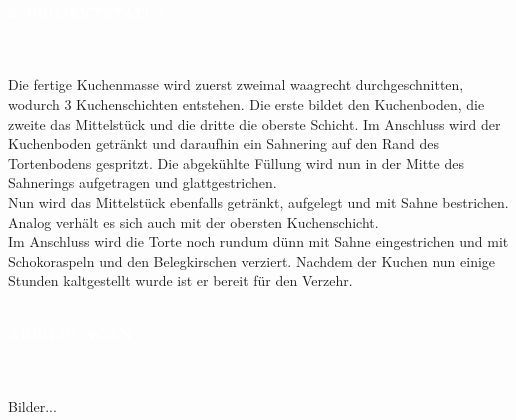 \documentclass[a4paper, 12 pt]{article}
\newcommand{\coloredSection}[1]{{\small \colorbox{DeepSkyBlue1}{\begin{minipage}{0.99\textwidth}{\textbf{#1 \vphantom{p\^{E}}}}\end{minipage}}}}
\begin{document}
 \\
\noindent
\coloredSection{\textbf{\textcolor{white}{2. PROJEKTSTATUS}}}\\[-0.3cm]\\
Die fertige Kuchenmasse wird zuerst zweimal waagrecht durchgeschnitten, wodurch 3 Kuchenschichten entstehen. Die erste bildet den Kuchenboden,
die zweite das Mittelstück und die dritte die oberste Schicht. Im Anschluss wird der Kuchenboden getränkt und daraufhin ein Sahnering auf den Rand des 
Tortenbodens gespritzt. Die abgekühlte Füllung wird nun in der Mitte des Sahnerings aufgetragen und glattgestrichen. \\
Nun wird das Mittelstück ebenfalls getränkt, aufgelegt und mit Sahne bestrichen. Analog verhält es sich auch mit der obersten Kuchenschicht. \\
Im Anschluss wird die Torte noch rundum dünn mit Sahne eingestrichen und mit Schokoraspeln und den Belegkirschen verziert. 
Nachdem der Kuchen nun einige Stunden kaltgestellt wurde ist er bereit für den Verzehr. \\\\
\noindent
\coloredSection{\textbf{\textcolor{white}{ABBILDUNGEN}}}\\[-0.3cm]\\
Bilder...\\
\end{document}
